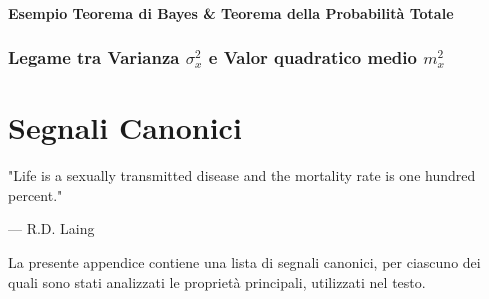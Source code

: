 \documentclass[12pt,oneside,openany]{memoir}
\numberwithin{equation}{subsection}
\begin{document}
\newpage
\subsubsection{Esempio Teorema di Bayes \& Teorema della Probabilit\`a Totale}

\newpage
\subsection{Legame tra Varianza $\sigma_x^2$ e Valor quadratico medio $m_x^2$}

\appendix
\chapter{Segnali Canonici}
\epigraph{"Life is a sexually transmitted disease and the mortality rate is one hundred percent."}{--- \textup{R.D. Laing}}
La presente appendice contiene una lista di segnali canonici, per ciascuno dei quali sono stati analizzati le propriet\`a principali, utilizzati nel testo.
\end{document}
